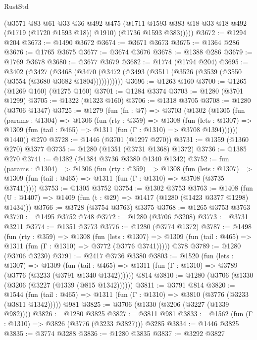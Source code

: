 \begin{lexlean}{RustStd}
\begin{coremodule}
{\begin{coremodule}
{{{{{{{{{{{{          (@3571
            @83
            @61
            @33
            @36
            @492
            @475
            (@1711 @1593 @383 @18 @33 @18 @492 (@1719 (@1720 @1593 @18)) @1910)
            (@1736 @1593 @383)))))
@3672 := @1294 @204
@3673 := @1490 @3672
@3674 := @3671 @3673
@3675 := @1364 @286
@3676 := @1765 @3675
@3677 := @3674 @3676
@3678 := @1388 @286
@3679 := @1769 @3678
@3680 := @3677 @3679
@3682 := @1774 (@1794 @204)
@3695 := @3402
    (@3427
      (@3468 (@3470 (@3472 (@3493 (@3511 (@3526 (@3539 (@3550 (@3554 (@3680 @3682 @1804)))))))))))
@3696 := @1263 @160
@3700 := @1265 (@1269 @160) (@1275 @160)
@3701 := @1284 @3374
@3703 := @1280 (@3701 @1299)
@3705 := @1322 (@1323 @160)
@3706 := @1318 @3705
@3708 := @1280 (@3706 @1347)
@3725 := @1279
    (fun (fn : @7) =>
    @3703
      (@1302
        (@1305
          (fun (params : @1304) =>
          @1306
            (fun (rty : @359) =>
            @1308
              (fun (lets : @1307) =>
              @1309 (fun (tail : @465) => @1311 (fun (Γ : @1310) => @3708 @1394))))))
        @1440))
    @270
@3728 := @1446 (@3701 (@1297 @270))
@3731 := @1359 (@1360 @270) @3377
@3735 := @1280 (@1351 (@3731 @1368) @1372)
@3736 := @1385 @270
@3741 := @1382 (@1384 @3736 @3380 @1340 @1342)
@3752 := fun (params : @1304) =>
  @1306
    (fun (rty : @359) =>
    @1308
      (fun (lets : @1307) =>
      @1309 (fun (tail : @465) => @1311 (fun (Γ : @1310) => @3708 (@3735 @3741)))))
@3753 := @1305 @3752
@3754 := @1302 @3753
@3763 := @1408 (fun (U : @1407) => @1409 (fun (t : @29) => @1417 (@1280 (@1423 @3377 @1298) @1434)))
@3766 := @3728 (@3754 @3763) @3375
@3768 := @1265 @3753 @3763
@3770 := @1495 @3752 @748
@3772 := @1280 (@3706 @3208)
@3773 := @3731 @3211
@3774 := @1351 @3773
@3776 := @1280 (@3774 @1372)
@3787 := @1498
    (fun (rty : @359) =>
    @1308
      (fun (lets : @1307) =>
      @1309 (fun (tail : @465) => @1311 (fun (Γ : @1310) => @3772 (@3776 @3741)))))
    @378
@3789 := @1280 (@3706 @3230)
@3791 := @2417 @3736 @3380
@3803 := @1520
    (fun (lets : @1307) =>
    @1309
      (fun (tail : @465) => @1311 (fun (Γ : @1310) => @3789 (@3776 (@3233 (@3791 @1340 @1342))))))
    @814
@3810 := @1280 (@3706 (@1330 (@3206 (@3227 (@1339 (@815 @1342))))))
@3811 := @3791 @814
@3820 := @1544
    (fun (tail : @465) => @1311 (fun (Γ : @1310) => @3810 (@3776 (@3233 (@3811 @1342)))))
    @981
@3825 := @3706 (@1330 (@3206 (@3227 (@1339 @982))))
@3826 := @1280 @3825
@3827 := @3811 @981
@3833 := @1562 (fun (Γ : @1310) => @3826 (@3776 (@3233 @3827))) @3285
@3834 := @1446 @3825
@3835 := @3774 @3288
@3836 := @1280 @3835
@3837 := @3292 @3827
}}}}}}}}}}}}
\end{coremodule}}
\end{coremodule}
\end{lexlean}
